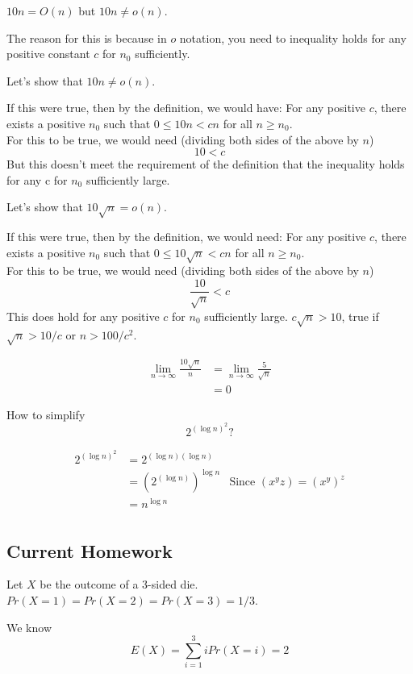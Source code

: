 \documentclass{article}
\begin{document}
$10 n = O(n)$ but $10 n \neq o(n)$.

The reason for this is because in $o$ notation, you need to inequality holds for any positive constant $c$ for $n_0$ sufficiently.

Let's show that $10 n \neq o(n)$.  

If this were true, then by the definition, we would have:
For any positive $c$, there exists a positive $n_0$ such that
$0 \leq 10 n < c n$ for all $n \geq n_0$.\\

For this to be true, we would need (dividing both sides of the above by $n$)
$$ 10 < c$$
But this doesn't meet the requirement of the definition that the inequality holds for any c for $n_0$ sufficiently large.

Let's show that $10 \sqrt{n} = o(n)$.  

If this were true, then by the definition, we would need:
For any positive $c$, there exists a positive $n_0$ such that
$0 \leq 10 \sqrt{n} < c n$ for all $n \geq n_0$.\\

For this to be true, we would need (dividing both sides of the above by $n$)
$$ \frac{10}{\sqrt{n}} < c$$
This does hold for any positive $c$ for $n_0$ sufficiently large.
$c\sqrt{n} > 10$, true if $\sqrt{n} > 10/c$ or $n > 100/c^2$.

\medskip

\begin{align*}
    \lim_{n \rightarrow \infty} \frac{10\sqrt{n}}{n} & = \lim_{n \rightarrow \infty} \frac{5}{\sqrt{n}}\\
    & = 0 
\end{align*}


How to simplify $$2^{(\log n)^2}?$$

\begin{align*}
    2^{(\log n)^2} & = 2^{(\log n)(\log n)}\\
    & = (2^{(\log n)})^{\log n} & \text{Since $(x^yz) = (x^y)^z$} \\
    & = n^{\log n} \\
\end{align*}

\subsection{Current Homework}
Let $X$ be the outcome of a $3$-sided die. $Pr(X = 1) = Pr(X = 2) = Pr(X=3) = 1/3$.

We know $$E(X) = \sum_{i=1}^3 i Pr(X = i) = 2$$
\end{document}
